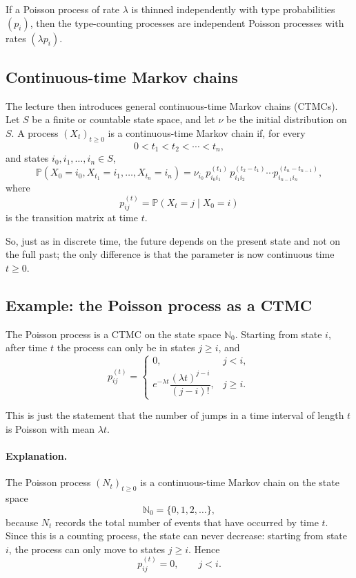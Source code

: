 \documentclass[11pt]{article}
\theoremstyle{definition}
\begin{document}
\begin{keyformula}
If a Poisson process of rate $\lambda$ is thinned independently with type probabilities $(p_i)$, then the type-counting processes are independent Poisson processes with rates $(\lambda p_i)$.
\end{keyformula}

\subsection{Continuous-time Markov chains}

The lecture then introduces general continuous-time Markov chains (CTMCs).
Let $S$ be a finite or countable state space, and let $\nu$ be the initial distribution on $S$.
A process $(X_t)_{t\ge 0}$ is a continuous-time Markov chain if, for every
\[
0<t_1<t_2<\cdots<t_n,
\]
and states $i_0,i_1,\dots,i_n\in S$,
\[
\mathbb P(X_0=i_0,X_{t_1}=i_1,\dots,X_{t_n}=i_n)
=
\nu_{i_0}
\,p_{i_0i_1}^{(t_1)}
\,p_{i_1i_2}^{(t_2-t_1)}\cdots
p_{i_{n-1}i_n}^{(t_n-t_{n-1})},
\]
where
\[
p_{ij}^{(t)}=\mathbb P(X_t=j\mid X_0=i)
\]
is the transition matrix at time $t$.

So, just as in discrete time, the future depends on the present state and not on the full past; the only difference is that the parameter is now continuous time $t\ge 0$.

\subsection{Example: the Poisson process as a CTMC}

The Poisson process is a CTMC on the state space $\mathbb N_0$.
Starting from state $i$, after time $t$ the process can only be in states $j\ge i$, and
\[
p_{ij}^{(t)}=
\begin{cases}
0, & j<i,\\[1ex]
e^{-\lambda t}\dfrac{(\lambda t)^{j-i}}{(j-i)!}, & j\ge i.
\end{cases}
\]

This is just the statement that the number of jumps in a time interval of length $t$ is Poisson with mean $\lambda t$.

\paragraph{Explanation.}
The Poisson process \((N_t)_{t\ge 0}\) is a continuous-time Markov chain on the state space
\[
\mathbb N_0=\{0,1,2,\dots\},
\]
because \(N_t\) records the total number of events that have occurred by time \(t\). Since this is a counting process, the state can never decrease: starting from state \(i\), the process can only move to states \(j\ge i\). Hence
\[
p_{ij}^{(t)}=0,\qquad j<i.
\]
\end{document}
